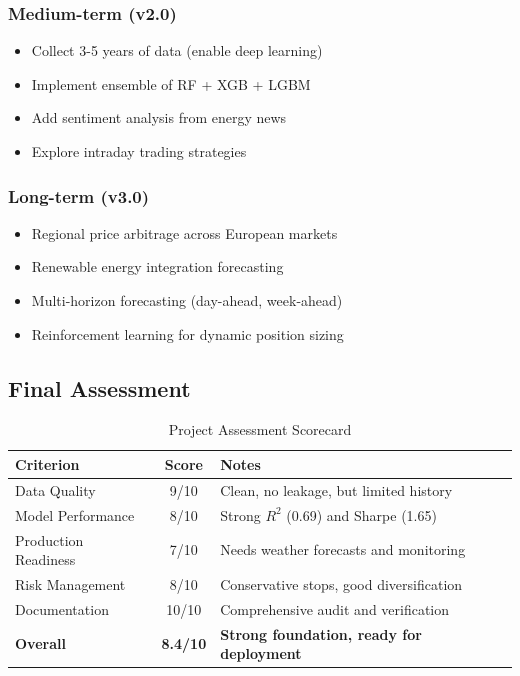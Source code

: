 \documentclass[11pt,a4paper]{article}
\begin{document}
\subsubsection{Medium-term (v2.0)}
\begin{itemize}
    \item Collect 3-5 years of data (enable deep learning)
    \item Implement ensemble of RF + XGB + LGBM
    \item Add sentiment analysis from energy news
    \item Explore intraday trading strategies
\end{itemize}

\subsubsection{Long-term (v3.0)}
\begin{itemize}
    \item Regional price arbitrage across European markets
    \item Renewable energy integration forecasting
    \item Multi-horizon forecasting (day-ahead, week-ahead)
    \item Reinforcement learning for dynamic position sizing
\end{itemize}

\subsection{Final Assessment}

\begin{table}[H]
\centering
\begin{tabular}{lcp{8cm}}
\toprule
\textbf{Criterion} & \textbf{Score} & \textbf{Notes} \\
\midrule
Data Quality & 9/10 & Clean, no leakage, but limited history \\
Model Performance & 8/10 & Strong $R^2$ (0.69) and Sharpe (1.65) \\
Production Readiness & 7/10 & Needs weather forecasts and monitoring \\
Risk Management & 8/10 & Conservative stops, good diversification \\
Documentation & 10/10 & Comprehensive audit and verification \\
\midrule
\textbf{Overall} & \textbf{8.4/10} & \textbf{Strong foundation, ready for deployment} \\
\bottomrule
\end{tabular}
\caption{Project Assessment Scorecard}
\end{table}
\end{document}
